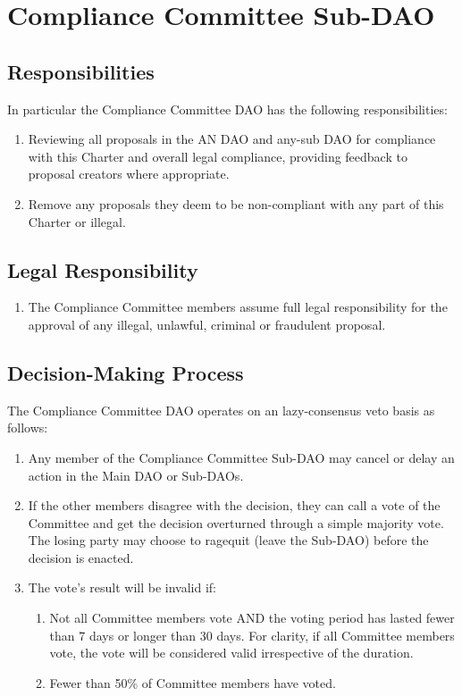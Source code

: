 \section{Compliance Committee Sub-DAO}

\subsection{Responsibilities}

In particular the Compliance Committee \ac{DAO} has the following responsibilities:
\begin{enumerate}
	\item Reviewing all proposals in the AN \ac{DAO} and any-sub \ac{DAO} for
	compliance with this Charter and overall legal compliance,
	providing feedback to proposal creators where appropriate.
	\item Remove any proposals they deem to be non-compliant with any
	part of this Charter or illegal.
\end{enumerate}


\subsection{Legal Responsibility}

\begin{enumerate}
	\item The Compliance Committee members assume full legal responsibility for the approval of any illegal, unlawful, criminal or fraudulent proposal.
\end{enumerate}


\subsection{Decision-Making Process}

The Compliance Committee \ac{DAO} operates on an lazy-consensus veto basis as follows:
\begin{enumerate}
	
	\item Any member of the Compliance Committee Sub-\ac{DAO} may cancel or delay an action in the Main \ac{DAO} or Sub-\acp{DAO}.
	\item If the other members disagree with the decision, they can call a vote of the Committee and get the decision overturned through a simple majority vote.
	The losing party may choose to ragequit (leave the Sub-\ac{DAO}) before the decision is enacted.
	\item The vote’s result will be invalid if:
	\begin{enumerate}
		\item Not all Committee members vote AND the voting period
		has lasted fewer than 7 days or longer than 30 days.
		For clarity, if all Committee members vote, the vote will be considered valid irrespective of the duration.
		\item Fewer than 50\% of Committee members have voted.
	\end{enumerate}

\end{enumerate}


